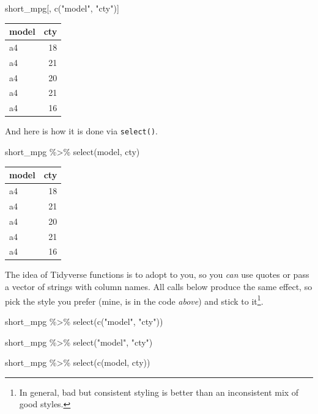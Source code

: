 \documentclass[
]{book}
\newenvironment{Shaded}{\begin{snugshade}}{\end{snugshade}}
\newcommand{\FunctionTok}[1]{\textcolor[rgb]{0.00,0.00,0.00}{#1}}
\newcommand{\NormalTok}[1]{#1}
\newcommand{\SpecialCharTok}[1]{\textcolor[rgb]{0.00,0.00,0.00}{#1}}
\newcommand{\StringTok}[1]{\textcolor[rgb]{0.31,0.60,0.02}{#1}}
\begin{document}
\begin{Shaded}
\begin{Highlighting}[]
\NormalTok{short\_mpg[, }\FunctionTok{c}\NormalTok{(}\StringTok{"model"}\NormalTok{, }\StringTok{"cty"}\NormalTok{)] }
\end{Highlighting}
\end{Shaded}

\begin{tabular}{l|r}
\hline
model & cty\\
\hline
a4 & 18\\
\hline
a4 & 21\\
\hline
a4 & 20\\
\hline
a4 & 21\\
\hline
a4 & 16\\
\hline
\end{tabular}

And here is how it is done via \texttt{select()}.

\begin{Shaded}
\begin{Highlighting}[]
\NormalTok{short\_mpg }\SpecialCharTok{\%\textgreater{}\%}
  \FunctionTok{select}\NormalTok{(model, cty)}
\end{Highlighting}
\end{Shaded}

\begin{tabular}{l|r}
\hline
model & cty\\
\hline
a4 & 18\\
\hline
a4 & 21\\
\hline
a4 & 20\\
\hline
a4 & 21\\
\hline
a4 & 16\\
\hline
\end{tabular}

The idea of Tidyverse functions is to adopt to you, so you \emph{can} use quotes or pass a vector of strings with column names. All calls below produce the same effect, so pick the style you prefer (mine, is in the code \emph{above}) and stick to it\footnote{In general, bad but consistent styling is better than an inconsistent mix of good styles.}.

\begin{Shaded}
\begin{Highlighting}[]
\NormalTok{short\_mpg }\SpecialCharTok{\%\textgreater{}\%}
  \FunctionTok{select}\NormalTok{(}\FunctionTok{c}\NormalTok{(}\StringTok{"model"}\NormalTok{, }\StringTok{"cty"}\NormalTok{))}
  
\NormalTok{short\_mpg }\SpecialCharTok{\%\textgreater{}\%}
  \FunctionTok{select}\NormalTok{(}\StringTok{"model"}\NormalTok{, }\StringTok{"cty"}\NormalTok{)}
  
\NormalTok{short\_mpg }\SpecialCharTok{\%\textgreater{}\%}
  \FunctionTok{select}\NormalTok{(}\FunctionTok{c}\NormalTok{(model, cty))}
\end{Highlighting}
\end{Shaded}
\end{document}
